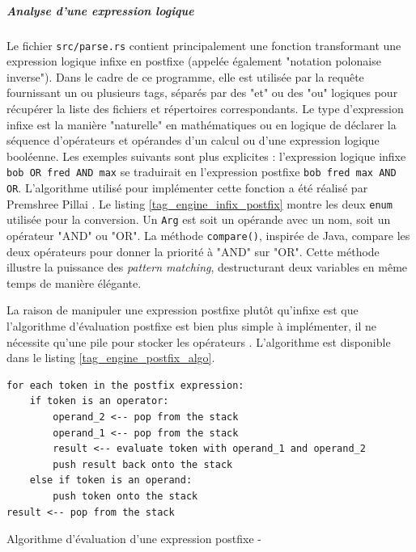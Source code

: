 \subparagraph{Analyse d'une expression logique}\label{tag_engine_parse}
Le fichier \texttt{src/parse.rs} contient principalement une fonction transformant 
une expression logique infixe en postfixe (appelée également "notation polonaise inverse"). 
Dans le cadre de ce programme, elle est utilisée par la requête fournissant un ou plusieurs tags, 
séparés par des "et" ou des "ou" logiques pour récupérer la liste des fichiers et répertoires 
correspondants. Le type d'expression infixe est la manière "naturelle" en mathématiques ou en 
logique de déclarer la séquence d'opérateurs et opérandes d'un calcul ou d'une expression logique 
booléenne. Les exemples suivants sont plus explicites : l'expression logique infixe 
\texttt{bob OR fred AND max} se traduirait en l'expression postfixe 
\texttt{bob fred max AND OR}. L'algorithme utilisé pour implémenter cette fonction 
a été réalisé par Premshree Pillai \cite{ref40}. Le listing \ref{tag_engine_infix_postfix} montre 
les deux \texttt{enum} utilisée pour la conversion. Un \texttt{Arg} est soit 
un opérande avec un nom, soit un opérateur "AND" ou "OR". La méthode \texttt{compare()}, 
inspirée de Java, compare les deux opérateurs pour donner la priorité à "AND" sur "OR". Cette 
méthode illustre la puissance des \textit{pattern matching}, destructurant deux variables en 
même temps de manière élégante.
\bigbreak
{}
\bigbreak
La raison de manipuler une expression postfixe 
plutôt qu'infixe est que l'algorithme d'évaluation postfixe est bien plus simple à implémenter, il 
ne nécessite qu'une pile pour stocker les opérateurs \cite{ref41}. L'algorithme est disponible dans 
le listing \ref{tag_engine_postfix_algo}.
\bigbreak
\begin{code}
    \begin{verbatim}
for each token in the postfix expression:
    if token is an operator:
        operand_2 <-- pop from the stack
        operand_1 <-- pop from the stack
        result <-- evaluate token with operand_1 and operand_2
        push result back onto the stack
    else if token is an operand:
        push token onto the stack
result <-- pop from the stack
    \end{verbatim}
    \caption{Algorithme d'évaluation d'une expression postfixe - \cite{ref41}}
    \label{tag_engine_postfix_algo}
\end{code}
